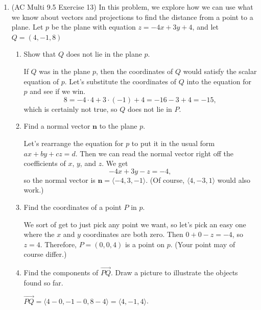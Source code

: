 \documentclass[10pt]{article}
\newcommand{\vn}{\mathbf{n}}
\newenvironment{red}{\color{red}}{\ignorespacesafterend}
\begin{document}
\begin{enumerate}[leftmargin=0pt]
\item  (AC Multi 9.5 Exercise 13) In this problem, we explore how we can use what we know about vectors and projections to find the distance from a point to a plane. Let $p$ be the plane with equation $z=-4x+3y+4$, and let $Q = (4, -1, 8)$
\begin{enumerate}
    \item Show that $Q$ does not lie in the plane $p$.
    
    \begin{red}
    If $Q$ was in the plane $p$, then the coordinates of $Q$ would satisfy the scalar equation of $p$. Let's substitute the coordinates of $Q$ into the equation for $p$ and see if we win.
    \[8 = -4\cdot 4 + 3\cdot (-1) + 4 = -16 - 3 + 4 = -15,\]
    which is certainly not true, so $Q$ does not lie in $P$.
    \end{red}
    \item Find a normal vector $\vn$ to the plane $p$.
    
    \begin{red}
    Let's rearrange the equation for $p$ to put it in the usual form $ax + by + cz = d$. Then we can read the normal vector right off the coefficients of $x$, $y$, and $z$. We get
    \[-4x + 3y - z = -4,\] so the normal vector is $\vn = \langle -4, 3, -1\rangle$. (Of course, $\langle 4, -3, 1\rangle$ would also work.)
    \end{red}
    \item Find the coordinates of a point $P$ in $p$.
    
    \begin{red}
    We sort of get to just pick any point we want, so let's pick an easy one where the $x$ and $y$ coordinates are both zero. Then $0 + 0 - z = -4$, so $z=4$. Therefore, $P = (0, 0, 4)$ is a point on $p$. (Your point may of course differ.)
    \end{red}
    \item Find the components of $\overrightarrow{PQ}$. Draw a picture to illustrate the objects found so far.
    
    \begin{red}
    $\overrightarrow{PQ} = \langle 4-0, -1-0, 8-4\rangle = \langle 4, -1, 4 \rangle$.
    

\end{red}
\end{enumerate}
\end{enumerate}
\end{document}
